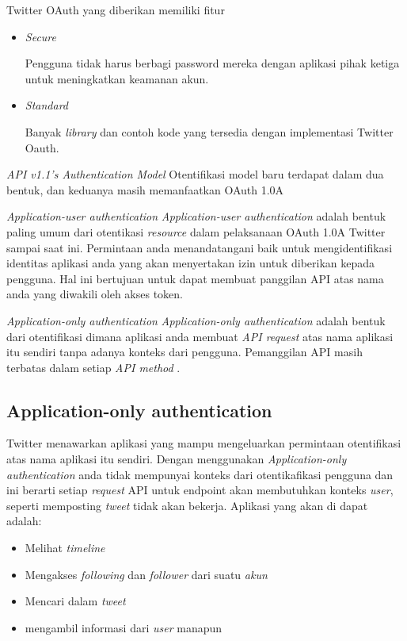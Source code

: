 Twitter OAuth yang diberikan memiliki fitur
\begin{itemize}
	\item \textit{Secure}
	
	Pengguna tidak harus berbagi password mereka dengan aplikasi pihak ketiga untuk meningkatkan keamanan akun.
	\item \textit{Standard}
	
	Banyak \textit{library} dan contoh kode yang tersedia dengan implementasi Twitter Oauth.
\end{itemize}

\textit{API v1.1's Authentication Model}
Otentifikasi model baru terdapat dalam dua bentuk, dan keduanya masih memanfaatkan OAuth 1.0A


\textit{Application-user authentication}
\textit{Application-user authentication} adalah bentuk paling umum dari otentikasi \textit{resource} dalam pelaksanaan OAuth 1.0A Twitter sampai saat ini. Permintaan anda menandatangani baik untuk mengidentifikasi identitas aplikasi anda yang akan menyertakan izin untuk diberikan kepada pengguna. Hal ini bertujuan untuk dapat membuat panggilan API atas nama anda yang diwakili oleh akses token.

\textit{Application-only authentication}
\textit{Application-only authentication} adalah bentuk dari otentifikasi dimana aplikasi anda membuat \textit{API request} atas nama aplikasi itu sendiri tanpa adanya konteks dari pengguna. Pemanggilan API masih terbatas dalam setiap \textit{API method} .


\subsection{Application-only authentication}
Twitter menawarkan aplikasi yang mampu mengeluarkan permintaan otentifikasi atas nama aplikasi itu sendiri. Dengan menggunakan \textit{Application-only authentication} anda tidak mempunyai konteks dari otentikafikasi pengguna dan ini berarti setiap \textit{request} API untuk endpoint akan membutuhkan konteks \textit{user}, seperti memposting \textit{tweet} tidak akan bekerja. Aplikasi yang akan di dapat adalah: 

\begin{itemize}
	\item Melihat \textit{timeline}
	\item Mengakses \textit{following} dan \textit{follower} dari suatu \textit{akun}
	\item Mencari dalam \textit{tweet}
	\item mengambil informasi dari \textit{user} manapun
\end{itemize}


